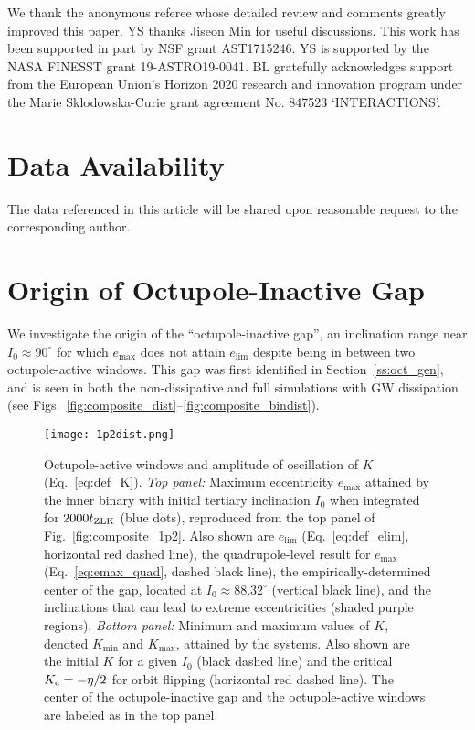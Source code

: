 \documentclass[
        fleqn,
        usenatbib,
    ]{mnras}
\begin{document}
We thank the anonymous referee whose detailed review and
comments greatly improved this paper. YS thanks Jiseon Min for useful
discussions. This work has been supported in part by NSF grant AST1715246. YS is
supported by the NASA FINESST grant 19-ASTRO19-0041. %
BL gratefully acknowledges support from the European Union's Horizon 2020
research and innovation program under the Marie Sklodowska-Curie grant agreement
No. 847523 `INTERACTIONS'.

\section{Data Availability}

The data referenced in this article will be shared upon reasonable request to
the corresponding author.




\clearpage
\onecolumn

\appendix

\section{Origin of Octupole-Inactive Gap}\label{app:gap}

We investigate the origin of the ``octupole-inactive gap'', an
inclination range near $I_0 \approx 90^\circ$ for which $e_{\max}$ does not
attain $e_{\lim}$ despite being in between two octupole-active windows. This gap
was first identified in Section~\ref{ss:oct_gen}, and is seen in both the
non-dissipative and full simulations with GW dissipation (see
Figs.~\ref{fig:composite_dist}--\ref{fig:composite_bindist}).

\begin{figure}
    \centering
    \texttt{[image: 1p2dist.png]}
    \caption{Octupole-active windows and amplitude of oscillation of $K$
    (Eq.~\ref{eq:def_K}). \emph{Top panel:} Maximum eccentricity $e_{\max}$
    attained by the inner binary with initial tertiary inclination $I_0$ when
    integrated for $2000 t_{\rm ZLK}$ (blue dots), reproduced from the top panel
    of Fig.~\ref{fig:composite_1p2}. Also shown are $e_{\lim}$
    (Eq.~\ref{eq:def_elim}, horizontal red dashed line), the quadrupole-level
    result for $e_{\max}$ (Eq.~\ref{eq:emax_quad}, dashed black line), the
    empirically-determined center of the gap, located at $I_0 \approx
    88.32^\circ$ (vertical black line), and the inclinations that can lead to
    extreme eccentricities (shaded purple regions). \emph{Bottom panel:} Minimum and maximum
    values of $K$, denoted $K_{\min}$ and $K_{\max}$, attained by the systems.
    Also shown are the initial $K$ for a given $I_0$ (black dashed line) and the
    critical $K_{\rm c} = -\eta / 2$ for orbit flipping (horizontal red dashed
    line). The center of the octupole-inactive gap and the octupole-active
    windows are labeled as in the top panel.
    }\label{fig:kdist}
\end{figure}
\end{document}
